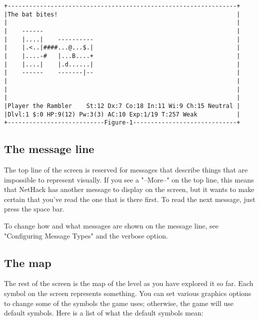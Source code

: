 \documentclass[11pt]{article}
\begin{document}
\begin{verbatim}
+----------------------------------------------------------------+
|The bat bites!                                                  |
|                                                                |
|    ------                                                      |
|    |....|    ----------                                        |
|    |.<..|####...@...$.|                                        |
|    |....-#   |...B....+                                        |
|    |....|    |.d......|                                        |
|    ------    -------|--                                        |
|                                                                |
|                                                                |
|                                                                |
|Player the Rambler    St:12 Dx:7 Co:18 In:11 Wi:9 Ch:15 Neutral |
|Dlvl:1 $:0 HP:9(12) Pw:3(3) AC:10 Exp:1/19 T:257 Weak           |
+---------------------------Figure-1-----------------------------+
\end{verbatim}

\subsection{The message line}
\label{sec:org037bfbb}

The top line of the screen is reserved for messages that describe
things that are impossible to represent visually.  If  you see a
"--More--" on the top line, this means that NetHack has another
message to display on the screen, but it wants to make certain that
you've read the one that is there first.  To read the next message,
just press the space bar.  

To change how and what messages are  shown  on  the  message line, see
"Configuring Message Types" and the verbose option. 

\subsection{The map}
\label{sec:orgb6fd488}

The rest  of the screen is the map of the level as you have explored
it so far.  Each symbol on the screen  represents  something.   You
can  set various graphics options to change some of the symbols the
game uses; otherwise, the game will  use  default symbols.  Here is a
list of what the default symbols mean: 
\end{document}
